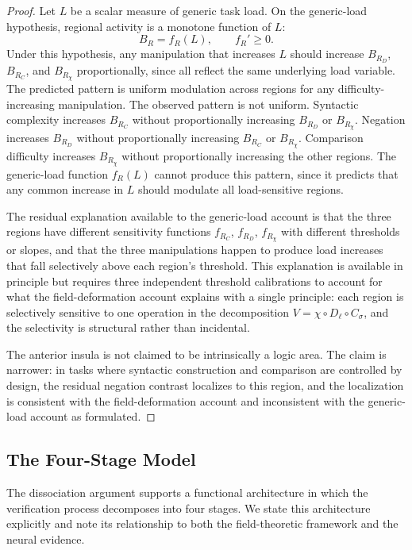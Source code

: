 \documentclass[12pt]{article}
\theoremstyle{remark}
\begin{document}
\begin{proof}
Let $L$ be a scalar measure of generic task load. On the generic-load
hypothesis, regional activity is a monotone function of $L$:
\[
B_R = f_R(L), \qquad f_R' \geq 0.
\]
Under this hypothesis, any manipulation that increases $L$ should
increase $B_{R_D}$, $B_{R_C}$, and $B_{R_\chi}$ proportionally, since
all reflect the same underlying load variable. The predicted pattern is
uniform modulation across regions for any difficulty-increasing
manipulation.
The observed pattern is not uniform. Syntactic complexity increases
$B_{R_C}$ without proportionally increasing $B_{R_D}$ or $B_{R_\chi}$.
Negation increases $B_{R_D}$ without proportionally increasing $B_{R_C}$
or $B_{R_\chi}$. Comparison difficulty increases $B_{R_\chi}$ without
proportionally increasing the other regions. The generic-load function
$f_R(L)$ cannot produce this pattern, since it predicts that any common
increase in $L$ should modulate all load-sensitive regions.

The residual explanation available to the generic-load account is that
the three regions have different sensitivity functions $f_{R_C}$,
$f_{R_D}$, $f_{R_\chi}$ with different thresholds or slopes, and that
the three manipulations happen to produce load increases that fall
selectively above each region's threshold. This explanation is available
in principle but requires three independent threshold calibrations to
account for what the field-deformation account explains with a single
principle: each region is selectively sensitive to one operation in the
decomposition $V = \chi \circ D_\ell \circ C_{\sigma}$, and the
selectivity is structural rather than incidental.

The anterior insula is not claimed to be intrinsically a logic area. The
claim is narrower: in tasks where syntactic construction and comparison
are controlled by design, the residual negation contrast localizes to
this region, and the localization is consistent with the field-deformation
account and inconsistent with the generic-load account as formulated.
\end{proof}

\subsection{The Four-Stage Model}

The dissociation argument supports a functional architecture in which the
verification process decomposes into four stages. We state this
architecture explicitly and note its relationship to both the
field-theoretic framework and the neural evidence.
\end{document}
